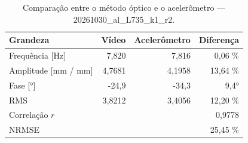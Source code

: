 \begin{table}[htbp]
  \centering
  \caption{Comparação entre o método óptico e o acelerômetro — 20261030\_al\_L735\_k1\_r2.}
  \label{tab:comp_20261030_al_L735_k1_r2}
  \begin{tabular}{lrrr}
    \toprule
    Grandeza & Vídeo & Acelerômetro & Diferença \\
    \midrule
    Frequência [Hz] & 7{,}820 & 7{,}816 & 0{,}06 \% \\
    Amplitude [mm / mm] & 4{,}7681 & 4{,}1958 & 13{,}64 \% \\
    Fase [°] & -24{,}9 & -34{,}3 & 9{,}4° \\
    RMS & 3{,}8212 & 3{,}4056 & 12{,}20 \% \\
    Correlação $r$ &  &  & 0{,}9778 \\
    NRMSE &  &  & 25{,}45 \% \\
    \bottomrule
  \end{tabular}
\end{table}
